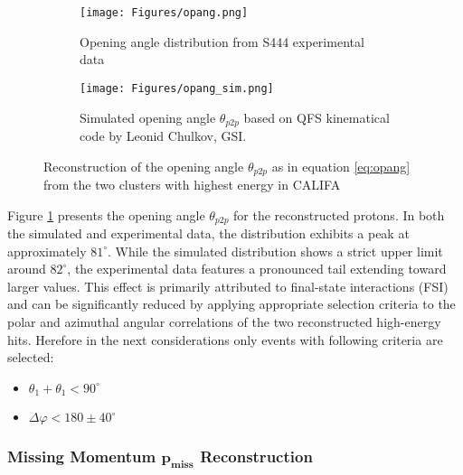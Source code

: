 \begin{figure}[htpb]
	\begin{subfigure}[t]{.43\linewidth}
    \texttt{[image: Figures/opang.png]}
	\caption{Opening angle distribution from S444 experimental data}
	\end{subfigure}
	\begin{subfigure}[t]{.47\linewidth}
    \texttt{[image: Figures/opang\_sim.png]}
	\caption{Simulated opening angle $\theta_{p2p}$ based on QFS kinematical code by Leonid Chulkov, GSI.}
	\end{subfigure}
    \caption{Reconstruction of the opening angle $\theta_{p2p}$ as in equation \ref{eq:opang} from the two clusters with highest energy in CALIFA }
    \label{fig:opang}
\end{figure}

Figure \ref{fig:opang} presents the opening angle $\theta_{p2p}$ for the reconstructed protons. In both the simulated and experimental data, the distribution exhibits a peak at approximately $81^{\circ}$. While the simulated distribution shows a strict upper limit around $82^{\circ}$, the experimental data features a pronounced tail extending toward larger values. This effect is primarily attributed to final-state interactions (FSI) and can be significantly reduced by applying appropriate selection criteria to the polar and azimuthal angular correlations of the two reconstructed high-energy hits.\newline
Herefore in the next considerations only events with following criteria are selected:
\begin{itemize}
\item $\theta_1 + \theta_1 < 90^{\circ}$
\item $\Delta \varphi < 180 \pm 40^{\circ}$
\end{itemize}

\subsubsection{Missing Momentum $\mathbf{p_{miss}}$ Reconstruction}\label{sec:p_miss}

